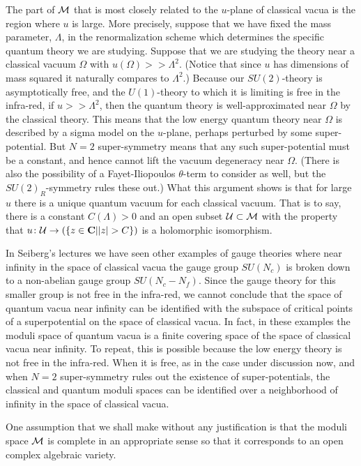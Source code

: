 \documentclass[10pt]{article}
\begin{document}
The part of ${\cal M}$ that is most closely related to the $u$-plane
of classical vacua is the region where $u$ is large.
More precisely, suppose that we have fixed  the mass parameter,
$\Lambda$, in
the renormalization scheme which determines the specific quantum
theory  we are studying. Suppose that we are studying the theory near
a classical vacuum $\Omega$ with $u(\Omega)>> \Lambda^2$. (Notice that
since $u$ has dimensions of mass squared it naturally compares to
$\Lambda^2$.) Because our $SU(2)$-theory is asymptotically free, and
the $U(1)$-theory to which it is limiting is free in the infra-red, if
$u>>\Lambda^2$, then the quantum theory is well-approximated near 
$\Omega$ by the classical theory.  This means that the low energy
quantum theory near $\Omega$ is described by a sigma model on the
$u$-plane, perhaps perturbed by some super-potential. 
But $N=2$  super-symmetry means that any
such super-potential must be a constant, and hence cannot lift the
vacuum degeneracy near $\Omega$.  (There is also the possibility of a
Fayet-Iliopoulos $\theta$-term  to consider as well, but the
$SU(2)_R$-symmetry rules these out.)  What this argument shows is that
for large $u$ there is a unique quantum vacuum for
each classical vacuum.
That is to say, there is a constant $C(\Lambda)>0$ and an open subset
${\cal U}\subset {\cal M}$ with the property that $u\colon {\cal U}\to 
(\{z\in {\bf C}| |z|>C\})$ is a holomorphic
isomorphism.


In Seiberg's lectures we have seen other examples of gauge theories
where near infinity in 
the space of classical vacua the
gauge group $SU(N_c)$ is broken down to a non-abelian gauge group
$SU(N_c-N_f)$. Since the gauge theory for this smaller group is not
free in the infra-red, we cannot conclude that the space of
quantum vacua near infinity can be identified with the subspace of
critical points of a superpotential on the space of classical vacua.
In fact, in
these examples the moduli space of quantum vacua is a finite covering
space of the space of classical vacua near infinity.  To repeat, this
is possible because the low energy theory is not free in the
infra-red.  When it is free, as in the case under discussion now, and
when $N=2$ super-symmetry rules out the existence of super-potentials, the
classical and quantum moduli spaces can be identified over a
neighborhood of infinity in the space of classical vacua.


One assumption that we shall make without any justification is that
the moduli space ${\cal M}$ is
complete in an appropriate sense so that it corresponds to an open
complex algebraic variety.
\end{document}
